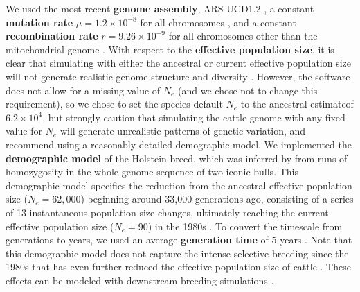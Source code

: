 \documentclass[hidelinks]{article}
\begin{document}
We used the most recent \textbf{genome assembly}, ARS-UCD1.2
\citep{Rosen2020}, a constant \textbf{mutation rate} \(\mu=1.2\times 10^{-8}\) for all chromosomes \citep{Harland2017}, 
and a constant \textbf{recombination rate} \(r=9.26 \times 10^{-9}\) for all chromosomes other than the mitochondrial genome \citep{Ma2015}.
%
With respect to the \textbf{effective population size}, it is clear that simulating with either 
the ancestral or current effective population size will not generate realistic genome structure and diversity \citep{MacLeod2013,Rosen2020}.
%
However, the software does not allow for a missing value of $N_e$ (and we chose not to change this requirement),
so we chose to set the species default $N_e$ to the ancestral estimateof $6.2\times 10^4$,
but strongly caution that %
simulating the cattle genome with any fixed value for $N_e$ will generate unrealistic patterns of genetic variation,
and recommend using a reasonably detailed demographic model.
%
We implemented the \textbf{demographic model} of the Holstein breed, which was
inferred by \cite{MacLeod2013} from runs of homozygosity in the whole-genome sequence of two iconic bulls.
%
This demographic model specifies the reduction from the ancestral effective population size ($N_e=62,000$) beginning around 33,000 generations ago, consisting of a series of 13 instantaneous population size changes, ultimately reaching the current effective population size ($N_e=90$) in the 1980s \citep[taken from Supplementary Table S1 in][]{MacLeod2013}.
%
To convert the timescale from generations to years, we used an average \textbf{generation time} of $5$ years \citep{MacLeod2013}.
%
Note that this demographic model does not capture the intense selective breeding since the 1980s that has even further reduced the effective population size of cattle \citep{MacLeod2013, VanRaden2020, Makanjouloa2020}. These effects can be modeled with
downstream breeding simulations \citep[e.g.,][]{Gaynor2020}.
%
\end{document}
